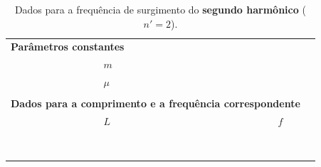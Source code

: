 \begin{table}[!htb]
\forcerectofloat
\caption{Dados para a frequência de surgimento do \textbf{segundo harmônico} ($n' = 2$).}
\label{Tab:FrequenciaFuncaoComprimento2}
	\begin{center}
		\begin{tabular}{cp{45mm}p{45mm}c}
		\toprule
\multicolumn{2}{l}{\textbf{Parâmetros constantes}}&\\
		\cmidrule{2-3}
		& \cellcolor[gray]{0.89}$m$ &\cellcolor[gray]{0.92} \\
		& \cellcolor[gray]{0.95}$\mu$ & \cellcolor[gray]{0.97}\\
		\cmidrule{2-3}
		\\
\multicolumn{3}{l}{\textbf{Dados para a comprimento e a frequência correspondente}} \\
		\cmidrule{2-3}		
		& $L$ & $f$ &\\
		\cmidrule{2-3}
		& \cellcolor[gray]{0.89} & \cellcolor[gray]{0.92} \\
		& \cellcolor[gray]{0.95} & \cellcolor[gray]{0.97} \\
		& \cellcolor[gray]{0.89} & \cellcolor[gray]{0.92} \\
		& \cellcolor[gray]{0.95} & \cellcolor[gray]{0.97} \\
		& \cellcolor[gray]{0.89} & \cellcolor[gray]{0.92} \\
		& \cellcolor[gray]{0.95} & \cellcolor[gray]{0.97} \\
		& \cellcolor[gray]{0.89} & \cellcolor[gray]{0.92} \\
		& \cellcolor[gray]{0.95} & \cellcolor[gray]{0.97} \\
		\cmidrule{2-3}
		\bottomrule
		\end{tabular}
	\end{center}
\end{table}

